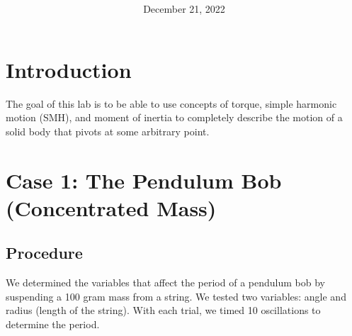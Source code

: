 \documentclass[article, 12pt]{article}
\title{
    \vspace{2in}
    \textmd{\textbf{\labTitle}}
    \normalsize\vspace{0.1in}\\
    \vspace{0.1in}\large{\text{\class: \professor}}
    \vspace{3in}
}
\author{\name}
\date{December 21, 2022}
\begin{document}
    \maketitle
    \thispagestyle{empty}
    \pagebreak
    \section*{Introduction}
    The goal of this lab is to be able to use concepts of torque, simple harmonic motion (SMH), and moment of inertia to completely describe the motion of a solid body that pivots at some arbitrary point.
    \section{Case 1: The Pendulum Bob (Concentrated Mass)}
    \subsection{Procedure}
    We determined the variables that affect the period of a pendulum bob by suspending a 100 gram mass from a string. We tested two variables: angle and radius (length of the string). With each trial, we timed 10 oscillations to determine the period.
\end{document}
